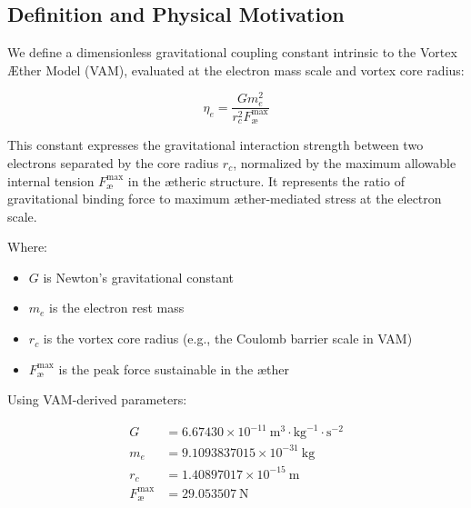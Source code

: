 \documentclass[12pt]{article}
\begin{document}
                \subsection{Definition and Physical Motivation}

                We define a dimensionless gravitational coupling constant intrinsic to the Vortex \AE{}ther Model (VAM), evaluated at the electron mass scale and vortex core radius:

                \begin{equation}
                \eta_e = \frac{G m_e^2}{r_c^2 F_{\text{\ae}}^{\text{max}}}
                \end{equation}

                This constant expresses the gravitational interaction strength between two electrons separated by the core radius \( r_c \), normalized by the maximum allowable internal tension \( F_{\text{\ae}}^{\text{max}} \) in the ætheric structure. It represents the ratio of gravitational binding force to maximum æther-mediated stress at the electron scale.

                \vspace{1em}
                \noindent Where:
                \begin{itemize}
                    \item \( G \) is Newton’s gravitational constant
                    \item \( m_e \) is the electron rest mass
                    \item \( r_c \) is the vortex core radius (e.g., the Coulomb barrier scale in VAM)
                    \item \( F_{\text{\ae}}^{\text{max}} \) is the peak force sustainable in the æther
                \end{itemize}

                Using VAM-derived parameters:

                \begin{align*}
                G &= 6.67430 \times 10^{-11}~\text{m}^3\cdot\text{kg}^{-1}\cdot\text{s}^{-2} \\
                m_e &= 9.1093837015 \times 10^{-31}~\text{kg} \\
                r_c &= 1.40897017 \times 10^{-15}~\text{m} \\
                F_{\text{\ae}}^{\text{max}} &= 29.053507~\text{N}
                \end{align*}
\end{document}
